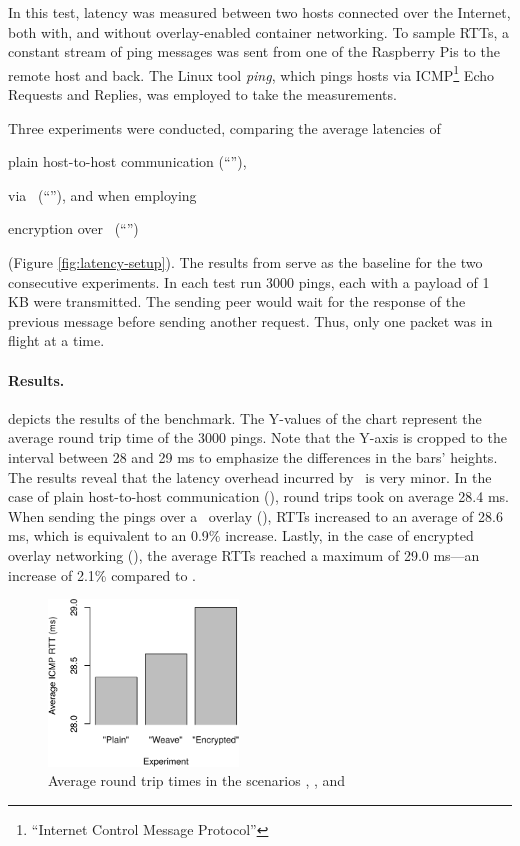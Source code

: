 In this test, latency was measured between two hosts connected over the Internet, both with, and without overlay-enabled container networking. To sample RTTs, a constant stream of ping messages was sent from one of the Raspberry Pis to the remote host and back. The Linux tool \emph{ping}, which pings hosts via ICMP\footnote{``Internet Control Message Protocol''} Echo Requests and Replies, was employed to take the measurements.

Three experiments were conducted, comparing the average latencies of
\begin{inparaenum}[(a)]
  \item plain host-to-host communication (``''),
  \item via \wnet\ (``''), and when employing
  \item encryption over \wnet\ (``'')
\end{inparaenum}
(\cf Figure \ref{fig:latency-setup}). The results from  serve as the baseline for the two consecutive experiments. In each test run 3000 pings, each with a payload of 1 KB were transmitted. The sending peer would wait for the response of the previous message before sending another request. Thus, only one packet was in flight at a time.

\paragraph{Results.}  depicts the results of the benchmark. The Y-values of the chart represent the average round trip time of the 3000 pings. Note that the Y-axis is cropped to the interval between 28 and 29 ms to emphasize the differences in the bars' heights. The results reveal that the latency overhead incurred by \wnet\ is very minor. In the case of plain host-to-host communication (), round trips took on average 28.4 ms. When sending the pings over a \weave\ overlay (), RTTs increased to an average of 28.6 ms, which is equivalent to an 0.9\% increase. Lastly, in the case of encrypted overlay networking (), the average RTTs reached a maximum of 29.0 ms---an increase of 2.1\% compared to .
\begin{figure}[htpb]
  \centering
  \includegraphics[width=0.45\textwidth]{figures/ping-bar}
  \caption[\weave\ latency experiment results]{Average round trip times in the scenarios , , and }\label{fig:latency-relative}
\end{figure}
%
%
%
%
%
%
%
%
%
%
